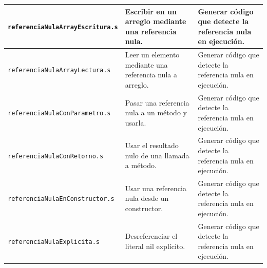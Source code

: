 \begin{longtable}{|>{\raggedright\arraybackslash}p{}|>{\raggedright\arraybackslash}p{}|>{\raggedright\arraybackslash}p{}|}
\texttt{referenciaNulaArrayEscritura\allowbreak .s} & Escribir en un arreglo mediante una referencia nula. & Generar código que detecte la referencia nula en ejecución. \\ \hline
\texttt{referenciaNulaArrayLectura\allowbreak .s} & Leer un elemento mediante una referencia nula a arreglo. & Generar código que detecte la referencia nula en ejecución. \\ \hline
\texttt{referenciaNulaConParametro\allowbreak .s} & Pasar una referencia nula a un método y usarla. & Generar código que detecte la referencia nula en ejecución. \\ \hline
\texttt{referenciaNulaConRetorno\allowbreak .s} & Usar el resultado nulo de una llamada a método. & Generar código que detecte la referencia nula en ejecución. \\ \hline
\texttt{referenciaNulaEnConstructor\allowbreak .s} & Usar una referencia nula desde un constructor. & Generar código que detecte la referencia nula en ejecución. \\ \hline
\texttt{referenciaNulaExplicita\allowbreak .s} & Desreferenciar el literal nil explícito. & Generar código que detecte la referencia nula en ejecución. \\ \hline
\end{longtable}
\endgroup
